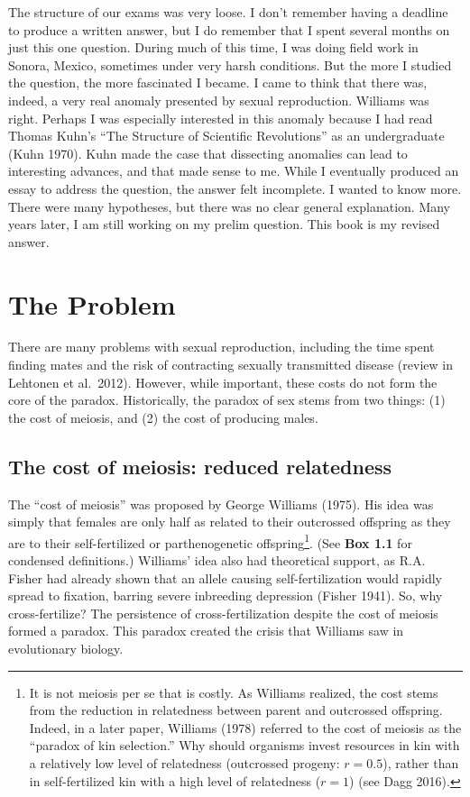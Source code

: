 \documentclass[
  letterpaper,
]{book}
\begin{document}
The structure of our exams was very loose. I don't remember having a
deadline to produce a written answer, but I do remember that I spent
several months on just this one question. During much of this time, I
was doing field work in Sonora, Mexico, sometimes under very harsh
conditions. But the more I studied the question, the more fascinated I
became. I came to think that there was, indeed, a very real anomaly
presented by sexual reproduction. Williams was right. Perhaps I was
especially interested in this anomaly because I had read Thomas Kuhn's
``The Structure of Scientific Revolutions'' as an undergraduate (Kuhn
1970). Kuhn made the case that dissecting anomalies can lead to
interesting advances, and that made sense to me. While I eventually
produced an essay to address the question, the answer felt incomplete. I
wanted to know more. There were many hypotheses, but there was no clear
general explanation. Many years later, I am still working on my prelim
question. This book is my revised answer.

\hypertarget{the-problem}{%
\section{The Problem}\label{the-problem}}

There are many problems with sexual reproduction, including the time
spent finding mates and the risk of contracting sexually transmitted
disease (review in Lehtonen et al.~2012). However, while important,
these costs do not form the core of the paradox. Historically, the
paradox of sex stems from two things: (1) the cost of meiosis, and (2)
the cost of producing males.

\hypertarget{the-cost-of-meiosis-reduced-relatedness}{%
\subsection{The cost of meiosis: reduced
relatedness}\label{the-cost-of-meiosis-reduced-relatedness}}

The ``cost of meiosis'' was proposed by George Williams (1975). His idea
was simply that females are only half as related to their outcrossed
offspring as they are to their self-fertilized or parthenogenetic
offspring\footnote{It is not meiosis per se that is costly. As Williams
  realized, the cost stems from the reduction in relatedness between
  parent and outcrossed offspring. Indeed, in a later paper, Williams
  (1978) referred to the cost of meiosis as the ``paradox of kin
  selection.'' Why should organisms invest resources in kin with a
  relatively low level of relatedness (outcrossed progeny: \(r = 0.5\)),
  rather than in self-fertilized kin with a high level of relatedness
  (\(r = 1\)) (see Dagg 2016).}. (See \textbf{Box 1.1} for condensed
definitions.) Williams' idea also had theoretical support, as R.A.
Fisher had already shown that an allele causing self-fertilization would
rapidly spread to fixation, barring severe inbreeding depression (Fisher
1941). So, why cross-fertilize? The persistence of cross-fertilization
despite the cost of meiosis formed a paradox. This paradox created the
crisis that Williams saw in evolutionary biology.
\end{document}
